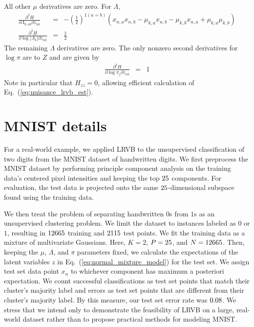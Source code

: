 \documentclass{article}\usepackage[]{graphicx}\usepackage[]{color}
\newcommand{\eq}[1]{Eq.~(\ref{eq:#1})}
\begin{document}
%
All other $\mu$ derivatives are zero. For $\Lambda$,
%
\begin{eqnarray*}
\frac{\partial^{2}H}{\partial\Lambda_{k,ab}\partial z_{nk}} & = & -\left(\frac{1}{2}\right)^{1(a=b)}\left(x_{n,a}x_{n,b}-\mu_{k,a}x_{n,b}-\mu_{k,b}x_{n,a}+\mu_{k,a}\mu_{k,b}\right)\\
\frac{\partial^{2}H}{\partial\log\left|\Lambda_{k}\right|\partial z_{nk}} & = & \frac{1}{2}
\end{eqnarray*}
%
The remaining $\Lambda$ derivatives are zero. The only nonzero second
derivatives for $\log\pi$ are to $Z$ and are given by
%
\begin{eqnarray*}
\frac{\partial^{2}H}{\partial\log\pi_{j}\partial z_{nk}} & = & 1
\end{eqnarray*}
%
Note in particular that $H_{zz} = 0$, allowing efficient calculation of
\eq{nuisance_lrvb_est}.

\section{MNIST details} \label{app:mnist_details}

For a real-world example,
we applied LRVB to the unsupervised classification of two digits
from the MNIST dataset of handwritten digits.
We first preprocess the MNIST dataset by performing principle component
analysis on the training data's centered pixel intensities
and keeping the top $25$ components.
For evaluation, the test data is projected onto the same
$25$-dimensional subspace found using the training data.

We then treat the problem of
separating handwritten $0$s from $1$s as an unsupervised clustering
problem.  We limit the dataset to instances labeled as $0$
or $1$, resulting in $12665$ training and $2115$ test points.
We fit the training data
as a mixture of multivariate Gaussians.  Here, $K=2$, $P=25$, and
$N=12665$.  Then, keeping the $\mu$, $\Lambda$, and $\pi$
parameters fixed, we calculate the expectations of the
latent variables $z$ in \eq{normal_mixture_model} for the test set.
We assign test set data point $x_n$ to whichever component has
maximum a posteriori expectation.  We count successful classifications
as test set points that match their cluster's majority label
and errors as test set points that are different from their cluster's
majority label.  By this measure, our test set error rate was
$0.08$. We stress that we intend only to demonstrate
the feasibility of LRVB on a large, real-world dataset rather than
to propose practical methods for modeling MNIST.
\end{document}
